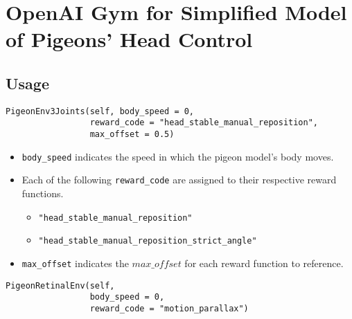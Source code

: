 \section{OpenAI Gym for Simplified Model of Pigeons' Head Control}


\subsection{Usage}
\begin{lstlisting}
PigeonEnv3Joints(self, body_speed = 0,
                 reward_code = "head_stable_manual_reposition",
                 max_offset = 0.5)
\end{lstlisting}
\begin{itemize}
    \item \lstinline|body_speed| indicates the speed in which the pigeon model's body moves.

    \item Each of the following \lstinline|reward_code| are assigned to their respective reward functions.
        \begin{itemize}
          \item \lstinline|"head_stable_manual_reposition"|
          \item \lstinline|"head_stable_manual_reposition_strict_angle"|
        \end{itemize}
    \item \lstinline|max_offset| indicates the $max\_offset$ for each reward function to reference.
\end{itemize}

\begin{lstlisting}
PigeonRetinalEnv(self,
                 body_speed = 0,
                 reward_code = "motion_parallax")
\end{lstlisting}

